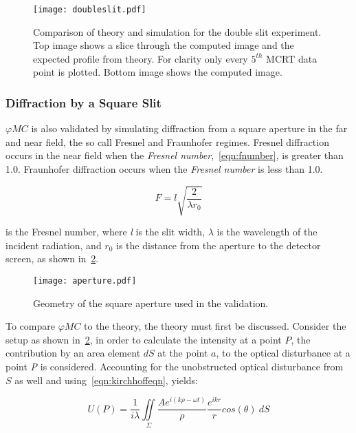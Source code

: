 \begin{figure}[!ht]
    \centering
    \texttt{[image: doubleslit.pdf]}
    \caption{Comparison of theory and simulation for the double slit experiment. Top image shows a slice through the computed image and the expected profile from theory. For clarity only every $5^{th}$ MCRT data point is plotted. Bottom image shows the computed image.}
    \label{fig:doubleslitcomp}
\end{figure}

\subsubsection*{Diffraction by a Square Slit}
$\varphi MC$ is also validated by simulating diffraction from a square aperture in the far and near field, the so call Fresnel and Fraunhofer regimes. 
Fresnel diffraction occurs in the near field when the \textit{Fresnel number},~\cref{eqn:fnumber}, is greater than 1.0.
Fraunhofer diffraction occurs when the \textit{Fresnel number} is less than 1.0.

\begin{equation}
F = l\sqrt{\frac{2}{\lambda r_0}}
\label{eqn:fnumber}
\end{equation}

 is the Fresnel number, where \textit{l} is the slit width, $\lambda$ is the wavelength of the incident radiation, and $r_0$ is the distance from the aperture to the detector screen, as shown in~\cref{fig:aperture}. 

\medskip
\begin{figure}[!ht]
    \centering
    \texttt{[image: aperture.pdf]}
    \caption{Geometry of the square aperture used in the validation.}
    \label{fig:aperture}
\end{figure}

To compare $\varphi MC$ to the theory, the theory must first be discussed.
Consider the setup as shown in~\cref{fig:aperture}, in order to calculate the intensity at a point $P$, the contribution by an area element $dS$ at the point $a$, to the optical disturbance at a point \textit{P} is considered.
Accounting for the unobstructed optical disturbance from $S$ as well and using~\cref{eqn:kirchhoffeqn}, yields: 


\begin{equation}
U(P)=\frac{1}{i\lambda}\iint\limits_{\Sigma} \frac{Ae^{i(k\rho-\omega t)}}{\rho} \frac{e^{ikr}}{r}cos(\theta)\ dS
\label{eqn:disturb}
\end{equation}


